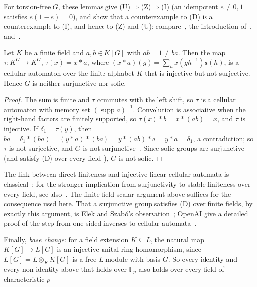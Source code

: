\documentclass[11pt]{article}
\theoremstyle{definition}
\theoremstyle{plain}
\newcommand{\F}{\mathbb{F}}
\begin{document}
For torsion-free $G$, these lemmas give (U)$\Rightarrow$(Z)$\Rightarrow$(I) (an idempotent $e\neq0,1$ satisfies $e(1-e)=0$), and show that a counterexample to (D) is a counterexample to (I), and hence to (Z) and (U); compare~\cite[Ch.~13]{Passman1977}, the introduction of~\cite{Gardam2021}, and~\cite[\S1]{BFF2024}.

\begin{lemma}\label{lem:surj}
Let $K$ be a finite field and $a,b\in K[G]$ with $ab=1\neq ba$. Then the map $\tau\colon K^G\to K^G$, $\tau(x)=x\ast a$, where $(x\ast a)(g)=\sum_{h}x(gh^{-1})a(h)$, is a cellular automaton over the finite alphabet $K$ that is injective but not surjective. Hence $G$ is neither surjunctive nor sofic.
\end{lemma}

\begin{proof}
The sum is finite and $\tau$ commutes with the left shift, so $\tau$ is a cellular automaton with memory set $(\operatorname{supp}a)^{-1}$. Convolution is associative when the right-hand factors are finitely supported, so $\tau(x)\ast b=x\ast(ab)=x$, and $\tau$ is injective. If $\delta_1=\tau(y)$, then $ba=\delta_1\ast(ba)=(y\ast a)\ast(ba)=y\ast(ab)\ast a=y\ast a=\delta_1$, a contradiction; so $\tau$ is not surjective, and $G$ is not surjunctive~\cite{Gottschalk1973}. Since sofic groups are surjunctive~\cite{Gromov1999,Weiss2000} (and satisfy (D) over every field~\cite[Cor.~4.7]{ElekSzabo2004}), $G$ is not sofic.
\end{proof}

The link between direct finiteness and injective linear cellular automata is classical~\cite{CeccheriniCoornaert2007,Phung2023}; for the stronger implication from surjunctivity to stable finiteness over every field, see also~\cite{CCP2025}. The finite-field scalar argument above suffices for the consequence used here.
That a surjunctive group satisfies (D) over finite fields, by exactly this argument, is Elek and Szab\'o's observation~\cite[\S1]{ElekSzabo2004}; OpenAI give a detailed proof of the step from one-sided inverses to cellular automata~\cite[Prop.~7.2]{OAI197b}.

Finally, \emph{base change}: for a field extension $K\subseteq L$, the natural map $K[G]\to L[G]$ is an injective unital ring homomorphism, since $L[G]=L\otimes_KK[G]$ is a free $L$-module with basis $G$. So every identity and every non-identity above that holds over $\F_p$ also holds over every field of characteristic $p$.
\end{document}
